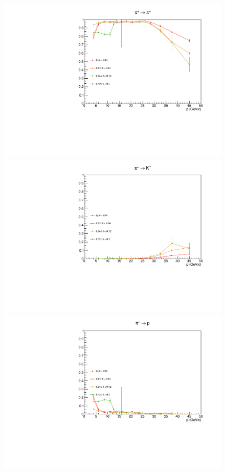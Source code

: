 \begin{figure}[!p]
  \centering
	\includegraphics[scale=0.38]{./gfx/pip_pi_less.pdf}
  \includegraphics[scale=0.38]{./gfx/pip_K_less.pdf}
  \includegraphics[scale=0.38]{./gfx/pip_p_less.pdf}

\end{figure}
